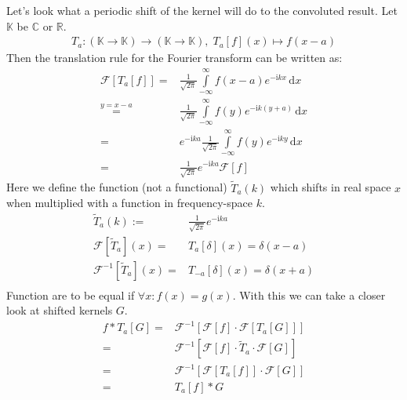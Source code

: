 \documentclass[10pt,a4paper]{article}
\begin{document}
Let's look what a periodic shift of the kernel will do to the convoluted result.
Let $\mathbb{K}$ be $\mathbb{C}$ or $\mathbb{R}$.
\begin{align}
T_a : \left( \mathbb{K} \rightarrow \mathbb{K} \right) \rightarrow
      \left( \mathbb{K} \rightarrow \mathbb{K} \right) , \;
      T_a[f](x) \mapsto f(x-a)
\end{align}
Then the translation rule for the Fourier transform can be written as:
\begin{align}
\mathcal{F}\left[ T_a[f] \right]
 = & \frac{1}{ \sqrt{2\pi} }
    \int\limits_{-\infty}^{\infty}
        f(x-a) e^{-\mathrm{i} k x}
    \,\mathrm{d}x \\
 \overset{ y = x-a }{ = } &
    \frac{1}{ \sqrt{2\pi} }
    \int\limits_{-\infty}^{\infty}
        f(y) e^{-\mathrm{i} k (y+a)}
    \,\mathrm{d}x \\
 = & e^{-\mathrm{i} k a}
    \frac{1}{ \sqrt{2\pi} }
    \int\limits_{-\infty}^{\infty}
        f(y) e^{-\mathrm{i} k y}
    \,\mathrm{d}x \\
 = & \frac{1}{ \sqrt{2\pi} } e^{-\mathrm{i} k a} \mathcal{F}\left[ f \right]
\end{align}
Here we define the function (not a functional) $\tilde{T}_a(k)$ which shifts in real space $x$ when multiplied with a function in frequency-space $k$.
\begin{align}
    \tilde{T}_a(k) := & \frac{1}{ \sqrt{2\pi} } e^{-\mathrm{i} k a} \\
    \mathcal{F}\left[ \tilde{T}_a \right](x)
    = & T_a\left[ \delta \right](x)
    =   \delta\left( x-a \right) \\
    \mathcal{F}^{-1}\left[ \tilde{T}_a \right](x)
    = & T_{-a}\left[ \delta \right](x)
    =   \delta\left( x+a \right) \\
\end{align}
Function are to be equal if $\forall x: f(x) = g(x)$.
With this we can take a closer look at shifted kernels $G$.
\begin{align}
    f \ast T_a[G]
    = & \mathcal{F}^{-1}\left[
          \mathcal{F}\left[ f \right] \cdot
          \mathcal{F}\left[ T_a[G] \right]
      \right] \\
    = & \mathcal{F}^{-1}\left[
          \mathcal{F}\left[ f \right] \cdot
          \tilde{T}_a \cdot
          \mathcal{F}\left[ G \right]
      \right] \\
    = & \mathcal{F}^{-1}\left[
          \mathcal{F}\left[ T_a[f] \right] \cdot
          \mathcal{F}\left[ G \right]
      \right] \\
    = & T_a[f] \ast G
\end{align}
\end{document}
